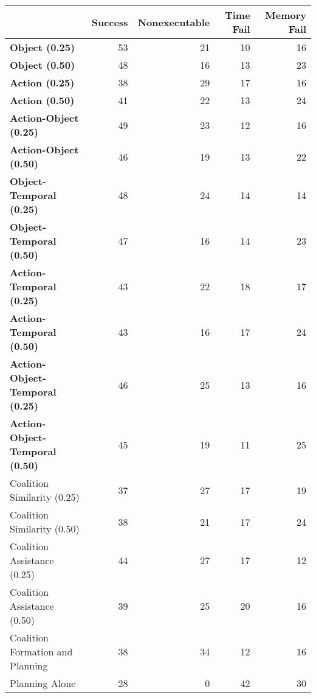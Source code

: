 \begin{tabular}{lrrrr}
\hline
                                        &   Success &   Nonexecutable &   Time Fail &   Memory Fail \\
\hline
 \textbf{Object (0.25)}                 &        53 &              21 &          10 &            16 \\
 \textbf{Object (0.50)}                 &        48 &              16 &          13 &            23 \\
 \textbf{Action (0.25)}                 &        38 &              29 &          17 &            16 \\
 \textbf{Action (0.50)}                 &        41 &              22 &          13 &            24 \\
 \textbf{Action-Object (0.25)}          &        49 &              23 &          12 &            16 \\
 \textbf{Action-Object (0.50)}          &        46 &              19 &          13 &            22 \\
 \textbf{Object-Temporal (0.25)}        &        48 &              24 &          14 &            14 \\
 \textbf{Object-Temporal (0.50)}        &        47 &              16 &          14 &            23 \\
 \textbf{Action-Temporal (0.25)}        &        43 &              22 &          18 &            17 \\
 \textbf{Action-Temporal (0.50)}        &        43 &              16 &          17 &            24 \\
 \textbf{Action-Object-Temporal (0.25)} &        46 &              25 &          13 &            16 \\
 \textbf{Action-Object-Temporal (0.50)} &        45 &              19 &          11 &            25 \\
 Coalition Similarity (0.25)            &        37 &              27 &          17 &            19 \\
 Coalition Similarity (0.50)            &        38 &              21 &          17 &            24 \\
 Coalition Assistance (0.25)            &        44 &              27 &          17 &            12 \\
 Coalition Assistance (0.50)            &        39 &              25 &          20 &            16 \\
 Coalition Formation and Planning       &        38 &              34 &          12 &            16 \\
 Planning Alone                         &        28 &               0 &          42 &            30 \\
\hline
\end{tabular}
